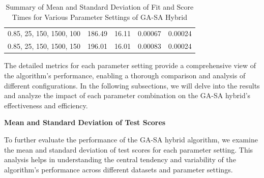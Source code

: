 \documentclass[
]{article}
\begin{document}
\begin{table}[H]
{\begin{tabular}{|c|c|c|c|c|}
                0.85, 25, 150, 1500, 100   & 186.49                 & 16.11                 & 0.00067                  & 0.00024                 \\
                0.85, 25, 150, 1500, 150   & 196.01                 & 16.01                 & 0.00083                  & 0.00024                 \\
                \hline
            \end{tabular}
        }
        \caption{Summary of Mean and Standard Deviation of Fit and Score Times for Various Parameter Settings of GA-SA Hybrid}
        \label{tab:gasa_summary_fit_score_times}
    \end{table}

    The detailed metrics for each parameter setting provide a comprehensive view of the algorithm's performance, enabling a thorough comparison and analysis of different configurations. In the following subsections, we will delve into the results and analyze the impact of each parameter combination on the GA-SA hybrid's effectiveness and efficiency.

    \textbf{Mean and Standard Deviation of Test Scores}

    To further evaluate the performance of the GA-SA hybrid algorithm, we examine the mean and standard deviation of test scores for each parameter setting. This analysis helps in understanding the central tendency and variability of the algorithm's performance across different datasets and parameter settings.
\end{document}
